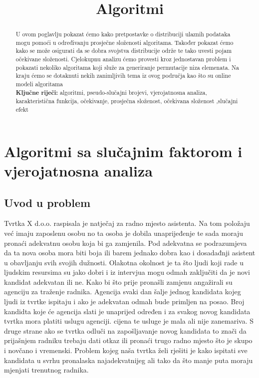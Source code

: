 \documentclass[10pt,a4paper]{article}
\title{Algoritmi}
\begin{document}
\maketitle
\tableofcontents
\newpage
\section{Algoritmi sa slučajnim faktorom i vjerojatnosna analiza} %
\label{sec:algoritmi_sa_slu_ajnim_faktorom_i_vjerojatnosna_analiza}

\begin{abstract}
U ovom poglavlju pokazat ćemo kako pretpostavke o distribuciji ulaznih podataka mogu pomoći u određivanju
prosječne složenosti algoritama. Također pokazat ćemo kako se može osigurati da se dobra svojstva distribucije 
održe te tako uvesti pojam očekivane složenosti. Cjelokupnu analizu ćemo provesti kroz jednostavan problem i 
pokazati nekoliko algoritama koji služe za generiranje permutacije niza elemenata. Na kraju ćemo se dotaknuti nekih zanimljivih tema iz ovog područja kao što su online modeli algoritama\\
\textbf{Ključne riječi:} algoritmi, pseudo-slučajni brojevi, vjerojatnosna analiza, karakteristična funkcija, očekivanje, prosječna složenost, očekivana složenost
,slučajni efekt 
\end{abstract}
\subsection{Uvod u problem}
Tvrtka X d.o.o. raspisala je natječaj za radno mjesto asistenta. Na tom položaju već imaju 
zaposlenu osobu no ta osoba je dobila unaprijeđenje te sada moraju pronaći adekvatnu osobu 
koja bi ga zamjenila. Pod adekvatna se podrazumjeva da ta nova osoba mora biti boja ili barem 
jednako dobra kao i dosadađnji asistent u obavljanju svih svojih dužnosti. Olakotna okolnost je 
ta što ljudi koji rade u ljudskim resursima  su jako dobri i iz intervjua mogu odmah zaključiti 
da je novi kandidat adekvatan ili ne.
Kako bi što prije pronašli zamjenu angažirali su agenciju za traženje radnika. 
Agencija svaki dan šalje jednog kandidata kojeg ljudi iz tvrtke ispitaju i ako je 
adekvatan odmah bude primljen na posao. Broj kandidta koje će agencija slati je unaprijed 
određen i za svakog novog kandidata tvrtka mora platiti uslugu agenciji. cijena te usluge je
mala ali nije zanemariva. S druge strane ako se tvrtka odluči na zapošljavanje novog kandidata 
to znači da prijašnjem radniku trebaju dati otkaz ili pronaći trugo radno mjesto što je skupo i novčano i vremenski.
Problem kojeg naša tvrtka želi rješiti je kako ispitati sve kandidata u svrhu pronalaska najadekvatnijeg 
ali tako da što manje puta moraju mjenjati trenutnog radnika.\\
\end{document}
